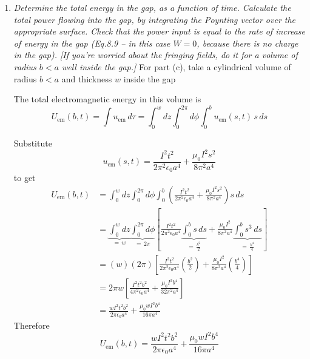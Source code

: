 \documentclass[12pt]{article}
\begin{document}
\begin{enumerate}
Also, in cylindrical coordinates, since \(S_\phi=0\) and \(S_z=0\),
$$
\nabla\cdot \mathbf S
=
\frac{1}{s}\frac{\partial}{\partial s}(sS_s)
$$

Here
$$
S_s=-\frac{I^2ts}{2\pi^2\epsilon_0 a^4}
$$
Therefore
$$
\begin{aligned}
\nabla\cdot \mathbf S
&=
\frac{1}{s}\frac{\partial}{\partial s}
\left[
s\left(
-\frac{I^2ts}{2\pi^2\epsilon_0 a^4}
\right)
\right] \\
&=
\frac{1}{s}\frac{\partial}{\partial s}
\left(
-\frac{I^2t}{2\pi^2\epsilon_0 a^4}s^2
\right) \\
&=
\frac{1}{s}
\left(
-\frac{I^2t}{2\pi^2\epsilon_0 a^4}\frac{\partial}{\partial s}(s^2)
\right) \\
&=
\frac{1}{s}
\left(
-\frac{I^2t}{2\pi^2\epsilon_0 a^4}(2s)
\right) \\
&=
-\frac{I^2t}{\pi^2\epsilon_0 a^4}
\end{aligned}
$$

Hence
$$
\boxed{
\frac{\partial u_{\text{em}}}{\partial t}
=
-\nabla\cdot \mathbf S
}
$$
as requested.
 
\item[(c)] \textit{Determine the total energy in the gap, as a function of time. Calculate the total power flowing into the gap, by integrating the Poynting vector over the appropriate surface. Check that the power input is equal to the rate of increase of energy in the gap (Eq.8.9 -- in this case $W=0$, because there is no charge in the gap). [If you're worried about the fringing fields, do it for a volume of radius $b<a$ well inside the gap.]}
For part (c), take a cylindrical volume of radius \(b<a\) and thickness \(w\) inside the gap

The total electromagnetic energy in this volume is
$$
U_{\text{em}}(b,t)=\int u_{\text{em}}\,d\tau
=\int_0^w dz\int_0^{2\pi}d\phi\int_0^b u_{\text{em}}(s,t)\,s\,ds
$$

Substitute
$$
u_{\text{em}}(s,t)
=
\frac{I^2t^2}{2\pi^2\epsilon_0 a^4}
+
\frac{\mu_0 I^2 s^2}{8\pi^2 a^4}
$$
to get
$$
\begin{aligned}
U_{\text{em}}(b,t)
&=
\int_0^w dz\int_0^{2\pi}d\phi\int_0^b
\left(
\frac{I^2t^2}{2\pi^2\epsilon_0 a^4}
+
\frac{\mu_0 I^2 s^2}{8\pi^2 a^4}
\right)s\,ds \\
&=
\underbrace{\int_0^w dz}_{=\,w} 
\underbrace{\int_0^{2\pi}d\phi}_{=\,2\pi}
\left[
\frac{I^2t^2}{2\pi^2\epsilon_0 a^4}\underbrace{\int_0^b s\,ds}_{=\,\frac{b^2}{2}}
+
\frac{\mu_0 I^2}{8\pi^2 a^4}\underbrace{\int_0^b s^3\,ds}_{=\,\frac{b^4}{4}}
\right] \\
&=
(w)(2\pi)
\left[
\frac{I^2t^2}{2\pi^2\epsilon_0 a^4}\left(\frac{b^2}{2}\right)
+
\frac{\mu_0 I^2}{8\pi^2 a^4}\left(\frac{b^4}{4}\right)
\right] \\
&=
2\pi w
\left[
\frac{I^2t^2b^2}{4\pi^2\epsilon_0 a^4}
+
\frac{\mu_0 I^2b^4}{32\pi^2 a^4}
\right] \\
&=
\frac{wI^2t^2b^2}{2\pi\epsilon_0 a^4}
+
\frac{\mu_0 wI^2b^4}{16\pi a^4}
\end{aligned}
$$
Therefore
$$
\boxed{
U_{\text{em}}(b,t)
=
\frac{wI^2t^2b^2}{2\pi\epsilon_0 a^4}
+
\frac{\mu_0 wI^2b^4}{16\pi a^4}
}
$$


\end{enumerate}
\end{document}
